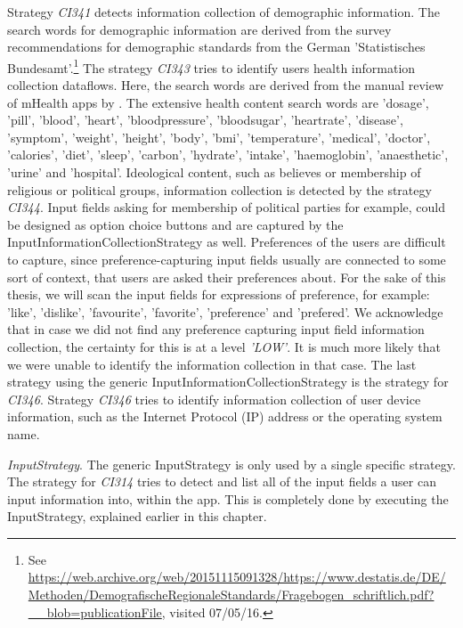 Strategy \textit{CI341} detects information collection of demographic information.
The search words for demographic information are derived from the survey recommendations for demographic standards from the German 'Statistisches Bundesamt'.\footnote{\raggedright See \url{https://web.archive.org/web/20151115091328/https://www.destatis.de/DE/Methoden/DemografischeRegionaleStandards/Fragebogen_schriftlich.pdf?__blob=publicationFile}, visited 07/05/16.}
The strategy \textit{CI343} tries to identify users health information collection dataflows.
Here, the search words are derived from the manual review of mHealth apps by \textcite{Bruggemann2016}. 
The extensive health content search words are 'dosage', 'pill', 'blood', 'heart', 'bloodpressure', 'bloodsugar', 'heartrate', 'disease', 'symptom', 'weight', 'height', 'body', 'bmi', 'temperature', 'medical', 'doctor', 'calories', 'diet', 'sleep', 'carbon', 'hydrate', 'intake', 'haemoglobin', 'anaesthetic', 'urine' and 'hospital'.
Ideological content, such as believes or membership of religious or political groups, information collection is detected by the strategy \textit{CI344}.
Input fields asking for membership of political parties for example, could be designed as option choice buttons and are captured by the InputInformationCollectionStrategy as well.
Preferences of the users are difficult to capture, since preference-capturing input fields usually are connected to some sort of context, that users are asked their preferences about.
For the sake of this thesis, we will scan the input fields for expressions of preference, for example: 'like', 'dislike', 'favourite', 'favorite', 'preference' and 'prefered'.
We acknowledge that in case we did not find any preference capturing input field information collection, the certainty for this is at a level \textit{'LOW'}.
It is much more likely that we were unable to identify the information collection in that case.
The last strategy using the generic InputInformationCollectionStrategy is the strategy for \textit{CI346}. 
Strategy \textit{CI346} tries to identify information collection of user device information, such as the Internet Protocol (\acs{IP}) address or the operating system name.

\textit{InputStrategy}. The generic InputStrategy is only used by a single specific strategy.
The strategy for \textit{CI314} tries to detect and list all of the input fields a user can input information into, within the app.
This is completely done by executing the InputStrategy, explained earlier in this chapter.

